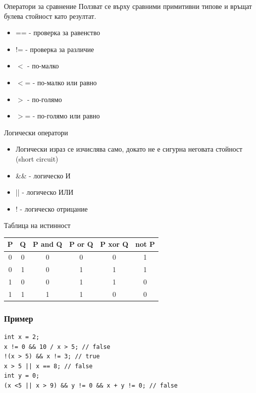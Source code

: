 \documentclass{beamer}
\begin{document}
\begin{frame}{Оператори за сравнение}
  \transdissolve
  Ползват се върху сравними примитивни
  типове и връщат булева стойност като резултат. \pause
  
  \begin{itemize}
  \item == - проверка за равенство
  \item != - проверка за различие
  \item $<$  - по-малко
  \item $<$= - по-малко или равно
  \item $>$  - по-голямо
  \item $>$= - по-голямо или равно
  \end{itemize}
\end{frame}

\begin{frame}{Логически оператори}
  \transdissolve
  \begin{itemize}
  \item   Логически израз се изчислява само, докато
    не е сигурна неговата стойност (short
    circuit) \pause
  \item \&\& - логическо И
  \item || - логическо ИЛИ
  \item ! - логическо отрицание
  \end{itemize}
\end{frame}

\begin{frame}{Таблица на истинност}
  \transdissolve 
  \begin{tabular}{|c|c|c|c|c|c|}
    \hline
    P & Q & P and Q & P or Q & P xor Q & not P \\
    \hline
    0 & 0 & 0 & 0 & 0 & 1 \\
    \hline
    0 & 1 & 0 & 1 & 1 & 1 \\
    \hline
    1 & 0 & 0 & 1 & 1 & 0 \\
    \hline
    1 & 1 & 1 & 1 & 0 & 0 \\
    \hline
  \end{tabular} 
\end{frame}

\begin{frame}[fragile]
  \frametitle{Пример}
  \transdissolve
\begin{lstlisting}
int x = 2;
x != 0 && 10 / x > 5; // false
!(x > 5) && x != 3; // true
x > 5 || x == 8; // false
int y = 0;
(x <5 || x > 9) && y != 0 && x + y != 0; // false
\end{lstlisting}
\end{frame}
\end{document}

